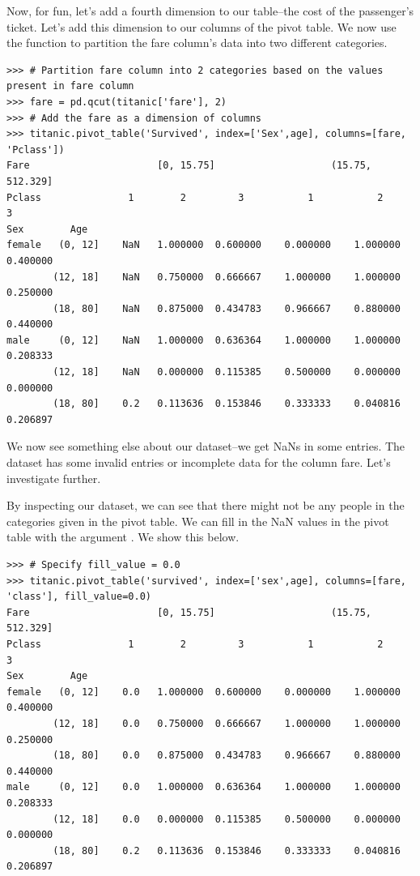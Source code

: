 Now, for fun, let's add a fourth dimension to our table--the cost of the passenger's ticket. Let's add this dimension to our columns of the pivot table. We now use the function  to partition the fare column's data into two different categories.

\begin{lstlisting}
>>> # Partition fare column into 2 categories based on the values present in fare column
>>> fare = pd.qcut(titanic['fare'], 2)
>>> # Add the fare as a dimension of columns
>>> titanic.pivot_table('Survived', index=['Sex',age], columns=[fare, 'Pclass'])
Fare					  [0, 15.75]					(15.75, 512.329]            
Pclass				 1		  2		    3			1		    2			3
Sex		   Age                                                                  
female	 (0, 12]	NaN	  1.000000	0.600000	0.000000	1.000000	0.400000     
		(12, 18]	NaN	  0.750000	0.666667	1.000000	1.000000	0.250000     
		(18, 80]	NaN	  0.875000	0.434783	0.966667	0.880000	0.440000   
male	 (0, 12]	NaN	  1.000000	0.636364	1.000000	1.000000	0.208333    
		(12, 18]	NaN	  0.000000	0.115385	0.500000	0.000000	0.000000    
		(18, 80]	0.2	  0.113636	0.153846	0.333333	0.040816	0.206897     
\end{lstlisting}

We now see something else about our dataset--we get NaNs in some entries. The dataset has some invalid entries or incomplete data for the column fare. Let's investigate further.

By inspecting our dataset, we can see that there might not be any people in the categories given in the pivot table. We can fill in the NaN values in the pivot table with the argument . We show this below.

\begin{lstlisting}
>>> # Specify fill_value = 0.0
>>> titanic.pivot_table('survived', index=['sex',age], columns=[fare, 'class'], fill_value=0.0)
Fare					  [0, 15.75]					(15.75, 512.329]            
Pclass				 1		  2		    3			1		    2			3
Sex		   Age                                                                  
female	 (0, 12]	0.0	  1.000000	0.600000	0.000000	1.000000	0.400000     
		(12, 18]	0.0	  0.750000	0.666667	1.000000	1.000000	0.250000     
		(18, 80]	0.0	  0.875000	0.434783	0.966667	0.880000	0.440000   
male	 (0, 12]	0.0	  1.000000	0.636364	1.000000	1.000000	0.208333    
		(12, 18]	0.0	  0.000000	0.115385	0.500000	0.000000	0.000000    
		(18, 80]	0.2	  0.113636	0.153846	0.333333	0.040816	0.206897    
\end{lstlisting}

